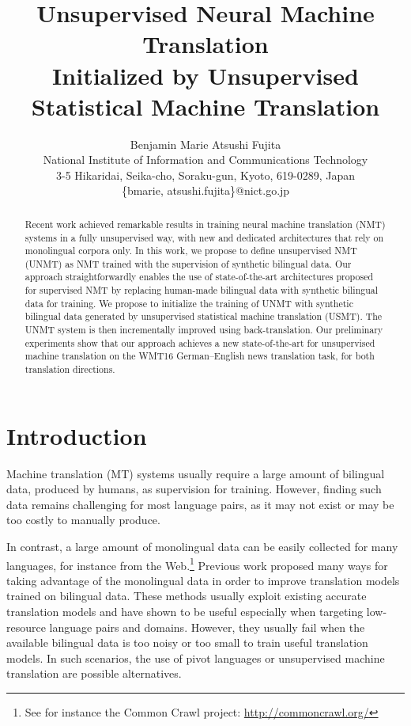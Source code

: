 \documentclass[11pt,a4paper]{article}
\title{Unsupervised Neural Machine Translation \\Initialized by Unsupervised Statistical Machine Translation}
\author{Benjamin Marie \qquad Atsushi Fujita \\
	National Institute of Information and Communications Technology \\
	3-5 Hikaridai, Seika-cho, Soraku-gun, Kyoto, 619-0289, Japan\\
	\textsf{\{bmarie, atsushi.fujita\}@nict.go.jp}
\\}
\date{}
\begin{document}
\maketitle
\begin{abstract}
Recent work achieved remarkable results in training neural machine translation (NMT) systems in a fully unsupervised way, with new and dedicated architectures that rely on monolingual corpora only. In this work, we propose to define unsupervised NMT (UNMT) as NMT trained with the supervision of synthetic bilingual data. Our approach straightforwardly enables the use of state-of-the-art architectures proposed for supervised NMT by replacing human-made bilingual data with synthetic bilingual data for training. We propose to initialize the training of UNMT with synthetic bilingual data generated by unsupervised statistical machine translation (USMT). The UNMT system is then incrementally improved using back-translation. Our preliminary experiments show that our approach achieves a new state-of-the-art for unsupervised machine translation on the WMT16 German--English news translation task, for both translation directions.
\end{abstract}



\section{Introduction}
Machine translation (MT) systems usually require a large amount of bilingual data, produced by humans, as supervision for training. However, finding such data remains challenging for most language pairs, as it may not exist or may be too costly to manually produce.

In contrast, a large amount of monolingual data can be easily collected for many languages, for instance from the Web.\footnote{See for instance the Common Crawl project: \url{http://commoncrawl.org/}} Previous work proposed many ways for taking advantage of the monolingual data in order to improve translation models trained on bilingual data.  These methods usually exploit existing accurate translation models and have shown to be useful especially when targeting low-resource language pairs and domains. However, they usually fail when the available bilingual data is too noisy or too small to train useful translation models. In such scenarios, the use of pivot languages or unsupervised machine translation are possible alternatives.
\end{document}
